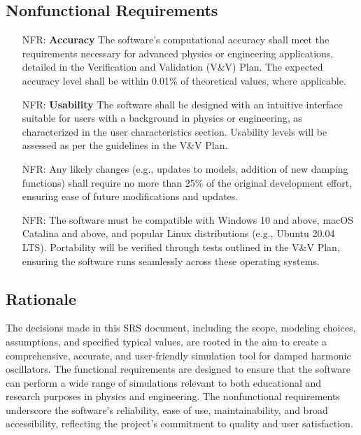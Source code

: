 \documentclass[12pt]{article}
\newcounter{nfrnum} %
\begin{document}
\subsection{Nonfunctional Requirements}

\noindent \begin{itemize}

\item[NFR\refstepcounter{nfrnum}\thenfrnum\label{NFR_Accuracy}:]
  \textbf{Accuracy} The software's computational accuracy shall meet the 
  requirements necessary for advanced physics or engineering applications, 
  detailed in the Verification and Validation (V\&V) Plan. The expected accuracy 
  level shall be within 0.01\% of theoretical values, where applicable.

\item[NFR\refstepcounter{nfrnum}\thenfrnum\label{NFR_Usability}:] \textbf{Usability}
The software shall be designed with an intuitive interface suitable for users 
with a background in physics or engineering, as characterized in the user 
characteristics section. Usability levels will be assessed as per the guidelines 
in the V\&V Plan.

\item[NFR\refstepcounter{nfrnum}\thenfrnum\label{NFR_Maintainability}:]
Any likely changes (e.g., updates to models, addition of new damping functions) 
shall require no more than 25\% of the original development effort, ensuring 
ease of future modifications and updates.

\item[NFR\refstepcounter{nfrnum}\thenfrnum\label{NFR_Portability}:]
The software must be compatible with Windows 10 and above, macOS Catalina and 
above, and popular Linux distributions (e.g., Ubuntu 20.04 LTS). Portability 
will be verified through tests outlined in the V\&V Plan, ensuring the software 
runs seamlessly across these operating systems.

\end{itemize}

\subsection{Rationale}

The decisions made in this SRS document, including the scope, modeling choices, 
assumptions, and specified typical values, are rooted in the aim to create a 
comprehensive, accurate, and user-friendly simulation tool for damped harmonic 
oscillators. The functional requirements are designed to ensure that the 
software can perform a wide range of simulations relevant to both educational 
and research purposes in physics and engineering. The nonfunctional requirements 
underscore the software's reliability, ease of use, maintainability, and broad 
accessibility, reflecting the project's commitment to quality and user 
satisfaction.
\end{document}
